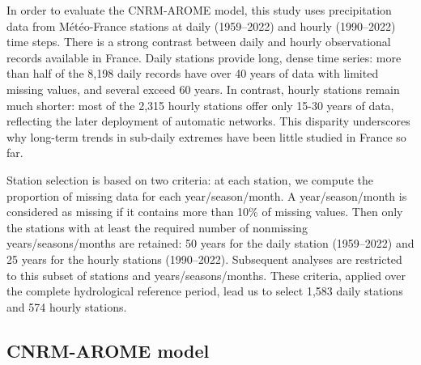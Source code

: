 ﻿\documentclass[hess, manuscript]{copernicus}
\providecommand{\DIFdelbegin}{} %
\begin{document}
In order to evaluate the CNRM-AROME model, this study uses precipitation data from Météo-France stations
\citep{meteofrance2024} at daily (1959--2022) and hourly (1990--2022) time
steps. There is a strong contrast between daily and hourly observational records available in France. Daily stations provide long, dense time series: more than half of the 8,198 daily records have over 40 years of data with limited missing values, and several exceed 60 years. In contrast, hourly stations remain much shorter: most of the 2,315 hourly stations offer only 15-30 years of data, reflecting the later deployment of automatic networks. This disparity underscores why long-term trends in sub-daily extremes have been little studied in France so far.  

Station selection is based on two criteria: at each station, we compute the proportion of missing data for each year/season/month. A year/season/month is considered as missing if it contains more than 10\% of missing values. Then only the stations with at least the required number of nonmissing years/seasons/months are retained: 50 years for the daily station (1959--2022) and 25 years for the hourly stations (1990--2022). Subsequent
analyses are restricted to this subset of stations and years/seasons/months. These criteria, applied over the complete hydrological reference period, lead us to select 1,583 daily stations and 574 hourly stations.

\subsection{CNRM-AROME model}\label{arome-model}

\DIFdelbegin %
\end{document}
